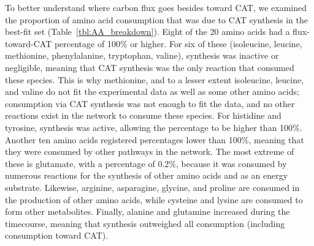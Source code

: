 \documentclass[12pt]{article}
\begin{document}
To better understand where carbon flux goes besides toward CAT, we examined the proportion of amino acid consumption that was due to CAT synthesis in the best-fit set (Table~\ref{tbl:AA_breakdown}).
Eight of the 20 amino acids had a flux-toward-CAT percentage of 100\% or higher.
For six of these (isoleucine, leucine, methionine, phenylalanine, tryptophan, valine), synthesis was inactive or negligible, meaning that CAT synthesis was the only reaction that consumed these species.
This is why methionine, and to a lesser extent isoleucine, leucine, and valine do not fit the experimental data as well as some other amino acids; consumption via CAT synthesis was not enough to fit the data, and no other reactions exist in the network to consume these species.
For histidine and tyrosine, synthesis was active, allowing the percentage to be higher than 100\%.
Another ten amino acids registered percentages lower than 100\%, meaning that they were consumed by other pathways in the network.
The most extreme of these is glutamate, with a percentage of 0.2\%, because it was consumed by numerous reactions for the synthesis of other amino acids and as an energy substrate.
Likewise, arginine, asparagine, glycine, and proline are consumed in the production of other amino acids, while cysteine and lysine are consumed to form other metabolites.
Finally, alanine and glutamine increased during the timecourse, meaning that synthesis outweighed all consumption (including consumption toward CAT).
\end{document}
